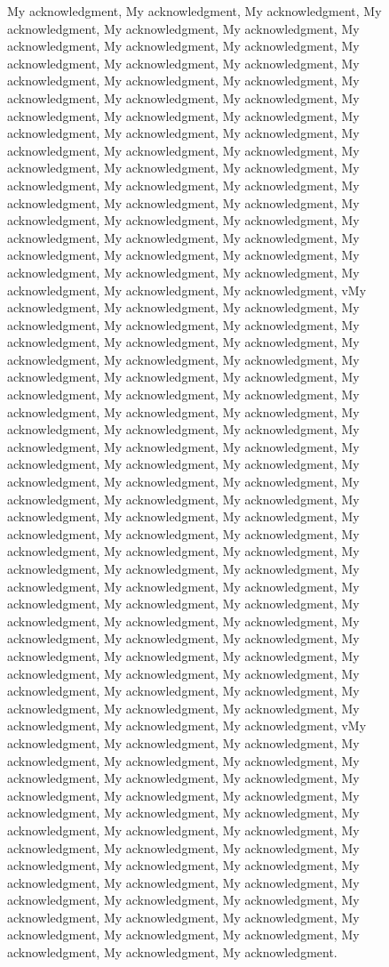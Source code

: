 My acknowledgment, My acknowledgment, My acknowledgment, My acknowledgment, My acknowledgment, My acknowledgment, My acknowledgment, My acknowledgment, My acknowledgment, My acknowledgment, My acknowledgment, My acknowledgment, My acknowledgment, My acknowledgment, My acknowledgment, My acknowledgment, My acknowledgment, My acknowledgment, My acknowledgment, My acknowledgment, My acknowledgment, My acknowledgment, My acknowledgment, My acknowledgment, My acknowledgment, My acknowledgment, My acknowledgment, My acknowledgment, My acknowledgment, My acknowledgment, My acknowledgment, My acknowledgment, My acknowledgment, My acknowledgment, My acknowledgment, My acknowledgment, My acknowledgment, My acknowledgment, My acknowledgment, My acknowledgment, My acknowledgment, My acknowledgment, My acknowledgment, My acknowledgment, My acknowledgment, My acknowledgment, My acknowledgment, My acknowledgment, My acknowledgment, My acknowledgment, My acknowledgment, vMy acknowledgment, My acknowledgment, My acknowledgment, My acknowledgment, My acknowledgment, My acknowledgment, My acknowledgment, My acknowledgment, My acknowledgment, My acknowledgment, My acknowledgment, My acknowledgment, My acknowledgment, My acknowledgment, My acknowledgment, My acknowledgment, My acknowledgment, My acknowledgment, My acknowledgment, My acknowledgment, My acknowledgment, My acknowledgment, My acknowledgment, My acknowledgment, My acknowledgment, My acknowledgment, My acknowledgment, My acknowledgment, My acknowledgment, My acknowledgment, My acknowledgment, My acknowledgment, My acknowledgment, My acknowledgment, My acknowledgment, My acknowledgment, My acknowledgment, My acknowledgment, My acknowledgment, My acknowledgment, My acknowledgment, My acknowledgment, My acknowledgment, My acknowledgment, My acknowledgment, My acknowledgment, My acknowledgment, My acknowledgment, My acknowledgment, My acknowledgment, My acknowledgment, My acknowledgment, My acknowledgment, My acknowledgment, My acknowledgment, My acknowledgment, My acknowledgment, My acknowledgment, My acknowledgment, My acknowledgment, My acknowledgment, My acknowledgment, My acknowledgment, My acknowledgment, My acknowledgment, My acknowledgment, My acknowledgment, My acknowledgment, My acknowledgment, My acknowledgment, My acknowledgment, My acknowledgment, My acknowledgment, My acknowledgment, My acknowledgment, vMy acknowledgment, My acknowledgment, My acknowledgment, My acknowledgment, My acknowledgment, My acknowledgment, My acknowledgment, My acknowledgment, My acknowledgment, My acknowledgment, My acknowledgment, My acknowledgment, My acknowledgment, My acknowledgment, My acknowledgment, My acknowledgment, My acknowledgment, My acknowledgment, My acknowledgment, My acknowledgment, My acknowledgment, My acknowledgment, My acknowledgment, My acknowledgment, My acknowledgment, My acknowledgment, My acknowledgment, My acknowledgment, My acknowledgment, My acknowledgment, My acknowledgment, My acknowledgment, My acknowledgment, My acknowledgment, My acknowledgment, My acknowledgment, My acknowledgment, My acknowledgment, My acknowledgment.